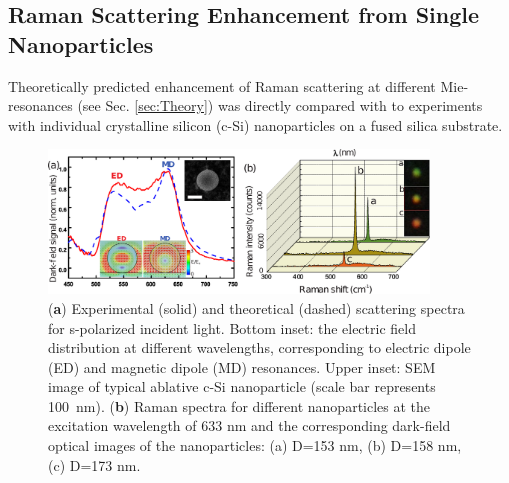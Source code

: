     \subsection{Raman Scattering Enhancement from Single Nanoparticles}
        \label{sec:RamanExp}
        Theoretically predicted enhancement of Raman scattering at different Mie-resonances (see Sec. \ref{sec:Theory}) was directly compared with to
        experiments with individual crystalline silicon (c-Si) nanoparticles on a fused silica substrate.

        \begin{figure}[!ht]
            \begin{center}
                \includegraphics[width=0.9\textwidth]{figs/results/enhance/EnhancementExperiment.eps}
            \end{center}
            \caption{(\textbf{a}) Experimental (solid) and theoretical (dashed) scattering spectra for s-polarized incident light.
            Bottom inset: the electric field distribution at different wavelengths, corresponding to electric dipole (ED) and magnetic
            dipole (MD) resonances. Upper inset: SEM image of typical ablative c-Si nanoparticle (scale bar represents 100~nm). (\textbf{b})
            Raman spectra for different nanoparticles at the excitation wavelength of 633 nm and the corresponding dark-field optical images of the
            nanoparticles: (a) D=153 nm, (b) D=158 nm, (c) D=173 nm.}
            \label{fig:EnhancementExp}
        \end{figure}

